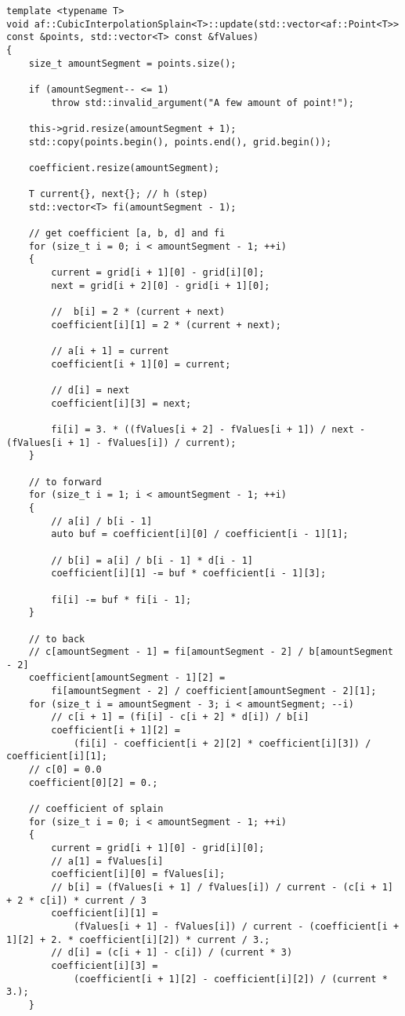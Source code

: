 \begin{enumerate}
\begin{lstlisting}
template <typename T>
void af::CubicInterpolationSplain<T>::update(std::vector<af::Point<T>> const &points, std::vector<T> const &fValues)
{
    size_t amountSegment = points.size();

    if (amountSegment-- <= 1)
        throw std::invalid_argument("A few amount of point!");

    this->grid.resize(amountSegment + 1);
    std::copy(points.begin(), points.end(), grid.begin());

    coefficient.resize(amountSegment);

    T current{}, next{}; // h (step)
    std::vector<T> fi(amountSegment - 1);

    // get coefficient [a, b, d] and fi
    for (size_t i = 0; i < amountSegment - 1; ++i)
    {
        current = grid[i + 1][0] - grid[i][0];
        next = grid[i + 2][0] - grid[i + 1][0];

        //  b[i] = 2 * (current + next)
        coefficient[i][1] = 2 * (current + next);

        // a[i + 1] = current
        coefficient[i + 1][0] = current;

        // d[i] = next
        coefficient[i][3] = next;

        fi[i] = 3. * ((fValues[i + 2] - fValues[i + 1]) / next - (fValues[i + 1] - fValues[i]) / current);
    }

    // to forward
    for (size_t i = 1; i < amountSegment - 1; ++i)
    {
        // a[i] / b[i - 1]
        auto buf = coefficient[i][0] / coefficient[i - 1][1];

        // b[i] = a[i] / b[i - 1] * d[i - 1]
        coefficient[i][1] -= buf * coefficient[i - 1][3];

        fi[i] -= buf * fi[i - 1];
    }

    // to back
    // c[amountSegment - 1] = fi[amountSegment - 2] / b[amountSegment - 2]
    coefficient[amountSegment - 1][2] =
        fi[amountSegment - 2] / coefficient[amountSegment - 2][1];
    for (size_t i = amountSegment - 3; i < amountSegment; --i)
        // c[i + 1] = (fi[i] - c[i + 2] * d[i]) / b[i]
        coefficient[i + 1][2] =
            (fi[i] - coefficient[i + 2][2] * coefficient[i][3]) / coefficient[i][1];
    // c[0] = 0.0
    coefficient[0][2] = 0.;

    // coefficient of splain
    for (size_t i = 0; i < amountSegment - 1; ++i)
    {
        current = grid[i + 1][0] - grid[i][0];
        // a[1] = fValues[i]
        coefficient[i][0] = fValues[i];
        // b[i] = (fValues[i + 1] / fValues[i]) / current - (c[i + 1] + 2 * c[i]) * current / 3
        coefficient[i][1] =
            (fValues[i + 1] - fValues[i]) / current - (coefficient[i + 1][2] + 2. * coefficient[i][2]) * current / 3.;
        // d[i] = (c[i + 1] - c[i]) / (current * 3)
        coefficient[i][3] =
            (coefficient[i + 1][2] - coefficient[i][2]) / (current * 3.);
    }


\end{lstlisting}
\end{enumerate}
